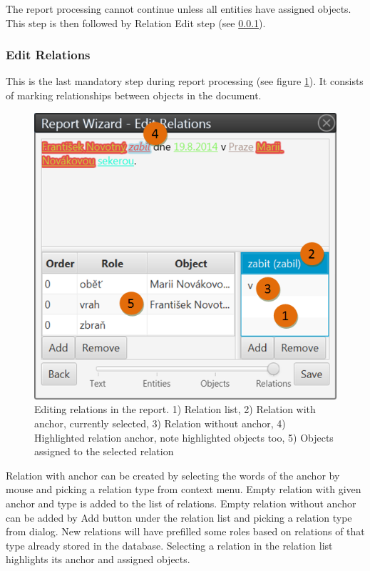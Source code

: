 The report processing cannot continue unless all entities have assigned
objects. This step is then followed by Relation Edit step (see
\ref{sssec:EditRelations}).

\subsubsection{Edit Relations}
\label{sssec:EditRelations}

This is the last mandatory step during report processing (see figure
\ref{fig:Relations}). It consists of marking relationships between objects in
the document.

\begin{figure}[!htb]
        \centering
        \includegraphics[width=\textwidth]{Images/relations}
        \caption{Editing relations in the report. 1) Relation list, 2) Relation
		 with anchor, currently selected, 3) Relation without anchor, 4) Highlighted
		 relation anchor, note highlighted objects too, 5) Objects assigned to
		 the selected relation}
        \label{fig:Relations}
\end{figure}

Relation with anchor can be created by selecting the words of the anchor by
mouse and picking a relation type from context menu. Empty relation with given
anchor and type is added to the list of relations. Empty relation without anchor
can be added by Add button under the relation list and picking a relation type
from dialog. New relations will have prefilled some roles based on relations of
that type already stored in the database. Selecting a relation in the relation
list highlights its anchor and assigned objects.

